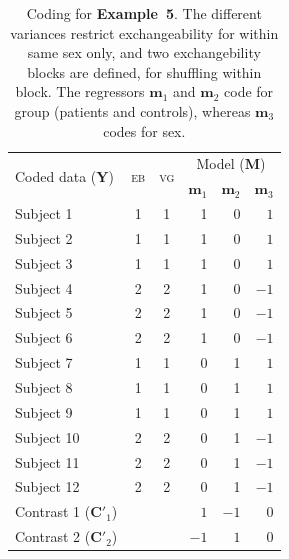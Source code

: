 \begin{table}[!t]
\caption[Coding for Example 5]{Coding for \textbf{Example~5}. The different variances restrict exchangeability for within same sex only, and two exchangebility blocks are defined, for shuffling within block. The regressors $\mathbf{m}_1$ and $\mathbf{m}_2$ code for group (patients and controls), whereas $\mathbf{m}_3$ codes for sex.}
\begin{center}
{\small
\begin{tabular}{@{}lccrrr@{}}
\toprule
\multirow{2}{*}{\vspace*{-1.7mm}Coded data ($\mathbf{Y}$)} & \multirow{2}{*}{\vspace*{-1.7mm}\textsc{eb}} & \multirow{2}{*}{\vspace*{-1.7mm}\textsc{vg}} & \multicolumn{3}{c}{Model ($\mathbf{M}$)\hspace*{-3mm}}\\
\cmidrule(l){4-6}
& & & $\mathbf{m}_1$ & $\mathbf{m}_2$ & $\mathbf{m}_3$\\
\midrule
Subject 1  & 1 & 1 & 1 & 0 & $1$\\
Subject 2  & 1 & 1 & 1 & 0 & $1$\\
Subject 3  & 1 & 1 & 1 & 0 & $1$\\
Subject 4  & 2 & 2 & 1 & 0 & $-1$\\
Subject 5  & 2 & 2 & 1 & 0 & $-1$\\
Subject 6  & 2 & 2 & 1 & 0 & $-1$\\
Subject 7  & 1 & 1 & 0 & 1 & $1$\\
Subject 8  & 1 & 1 & 0 & 1 & $1$\\
Subject 9  & 1 & 1 & 0 & 1 & $1$\\
Subject 10 & 2 & 2 & 0 & 1 & $-1$\\
Subject 11 & 2 & 2 & 0 & 1 & $-1$\\
Subject 12 & 2 & 2 & 0 & 1 & $-1$\\
\midrule
Contrast 1 ($\mathbf{C}'_1$) & & & $1$ & $-1$ & 0\\
Contrast 2 ($\mathbf{C}'_2$) & & & $-1$ & $1$ & 0\\
\bottomrule
\end{tabular}}
\end{center}
\label{tab:ex_variance}
\end{table}

